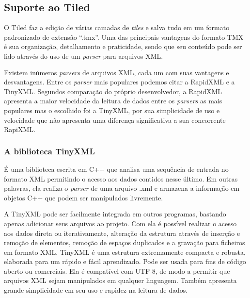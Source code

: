 \subsection{Suporte ao Tiled}
%
O Tiled faz a edição de várias camadas de \textit{tiles} e salva tudo em um formato padronizado de extensão ``.tmx''. Uma das principais vantagens do formato TMX é sua organização, detalhamento e praticidade, sendo que seu conteúdo pode ser lido através do uso de um \textit{parser} para arquivos XML.
\par 
Existem inúmeros \textit{parsers} de arquivos XML, cada um com suas vantagens e desvantagens. Entre os \textit{parser} mais populares podemos citar a RapidXML e a TinyXML. Segundos comparação do próprio desenvolvedor, a RapidXML apresenta a maior velocidade da leitura de dados entre os \textit{parsers} as mais populares mas o escolhido foi a TinyXML, por sua simplicidade de uso e velocidade que não apresenta uma diferença significativa a sua concorrente RapiXML. 
%
%
\subsubsection{A biblioteca TinyXML}
\label{tinyXML}
%
É uma biblioteca escrita em C++ que analisa uma sequência de entrada no formato XML permitindo o acesso aos dados contidos nesse último. Em outras palavras, ela realiza o \textit{parser} de uma arquivo .xml e armazena a informação em objetos C++ que podem ser manipulados livremente. 
\par 
A TinyXML \cite{TinyXMLTutorial} pode ser facilmente integrada em outros programas, bastando apenas adicionar seus 
arquivos ao projeto. Com ela é possível realizar o acesso aos dados direta ou iterativamente, alteração da estrutura através 
de inserção e remoção de elementos, remoção de espaços duplicados e a gravação para ficheiros em formato XML.
TinyXML é uma estrutura extremamente compacta e robusta, elaborada para um rápido e fácil aprendizado. Pode ser usada para 
fins de código aberto ou comerciais. Ela é compatível com UTF-8, de modo a permitir que arquivos XML sejam manipulados em 
qualquer linguagem. Também apresenta grande simplicidade em seu uso e rapidez na leitura de dados.
%
%
